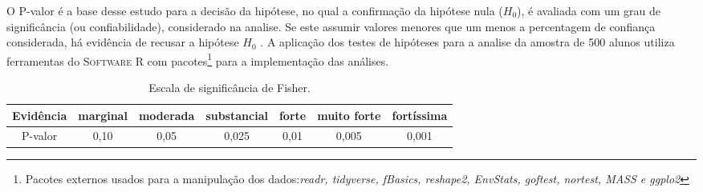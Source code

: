 O P-valor é a base desse estudo para a decisão da hipótese, no qual a confirmação da hipótese nula ($H_0$), é avaliada com um grau de significância (ou confiabilidade), considerado na analise. Se este assumir valores menores que um menos a percentagem de confiança considerada, há evidência de recusar a hipótese $H_0$ \cite[pag. 364]{morettin2017estatistica}. A aplicação dos testes de hipóteses para a analise da amostra de 500 alunos utiliza ferramentas do \textsc{Software R} com pacotes\footnote{Pacotes externos usados para a manipulação dos dados:\textit{readr, tidyverse, fBasics, reshape2, EnvStats, goftest, nortest, MASS e ggplo2}} para a implementação das análises.


\begin{table}[htb]
\caption{\label{p_valor} Escala de significância de Fisher.}
    \centering
    \begin{tabular}{c|cccccc}
    \toprule
    Evidência & marginal & moderada & substancial & forte & muito forte & fortíssima\\
    \midrule
        P-valor & 0,10 & 0,05 & 0,025 & 0,01 & 0,005 & 0,001\\
    \bottomrule
    \end{tabular}
\end{table}